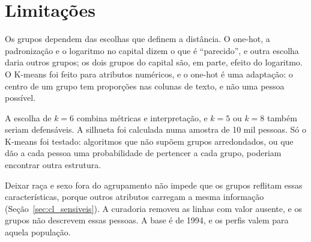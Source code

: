\section{Limitações}\label{sec:km_limitacoes}

Os grupos dependem das escolhas que definem a distância. O one-hot, a padronização e o logaritmo no capital dizem o que é ``parecido'', e outra escolha daria outros grupos; os dois grupos do capital são, em parte, efeito do logaritmo. O K-means foi feito para atributos numéricos, e o one-hot é uma adaptação: o centro de um grupo tem proporções nas colunas de texto, e não uma pessoa possível.

A escolha de $k = 6$ combina métricas e interpretação, e $k = 5$ ou $k = 8$ também seriam defensáveis. A silhueta foi calculada numa amostra de 10 mil pessoas. Só o K-means foi testado: algoritmos que não supõem grupos arredondados, ou que dão a cada pessoa uma probabilidade de pertencer a cada grupo, poderiam encontrar outra estrutura.

Deixar raça e sexo fora do agrupamento não impede que os grupos reflitam essas características, porque outros atributos carregam a mesma informação (Seção~\ref{sec:cl_sensiveis}). A curadoria removeu as linhas com valor ausente, e os grupos não descrevem essas pessoas. A base é de 1994, e os perfis valem para aquela população.
